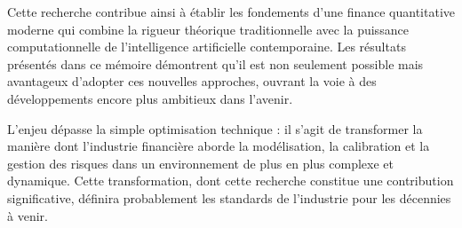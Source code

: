 Cette recherche contribue ainsi à établir les fondements d'une finance quantitative moderne qui combine la rigueur théorique traditionnelle avec la puissance computationnelle de l'intelligence artificielle contemporaine. Les résultats présentés dans ce mémoire démontrent qu'il est non seulement possible mais avantageux d'adopter ces nouvelles approches, ouvrant la voie à des développements encore plus ambitieux dans l'avenir.

L'enjeu dépasse la simple optimisation technique : il s'agit de transformer la manière dont l'industrie financière aborde la modélisation, la calibration et la gestion des risques dans un environnement de plus en plus complexe et dynamique. Cette transformation, dont cette recherche constitue une contribution significative, définira probablement les standards de l'industrie pour les décennies à venir.
